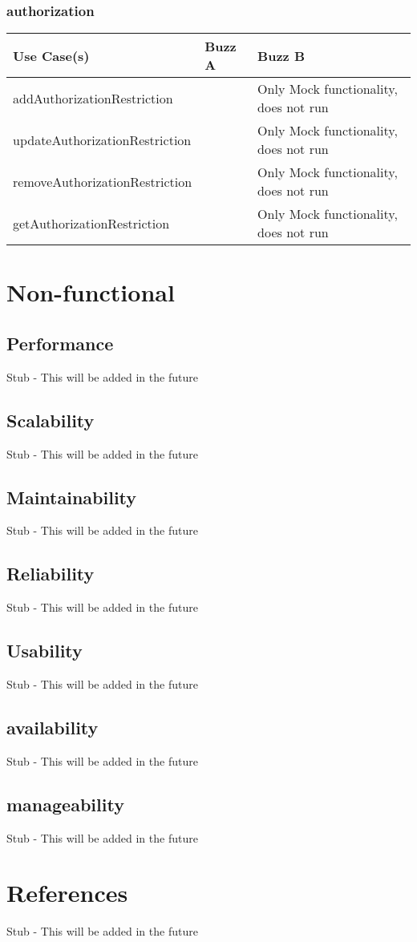 \documentclass[12pt]{article}
\begin{document}
\subsubsection{authorization}%
\begin{tabular}{|l|l|l|}

\hline
Use Case(s) & Buzz A & Buzz B \\ 
\hline
addAuthorizationRestriction &  & Only Mock functionality, does not run\\ %
\hline
updateAuthorizationRestriction &  & Only Mock functionality, does not run\\ %
\hline
removeAuthorizationRestriction &  & Only Mock functionality, does not run\\ %
\hline
getAuthorizationRestriction &  & Only Mock functionality, does not run\\ %



\end{tabular}
\section{Non-functional} %
\subsection{Performance}
Stub - This will be added in the future
\subsection{Scalability}
Stub - This will be added in the future
\subsection{Maintainability}
Stub - This will be added in the future
\subsection{Reliability}
Stub - This will be added in the future
\subsection{Usability}
Stub - This will be added in the future
\subsection{availability}
Stub - This will be added in the future
\subsection{manageability}
Stub - This will be added in the future

\section{References}
Stub - This will be added in the future
\end{document}
